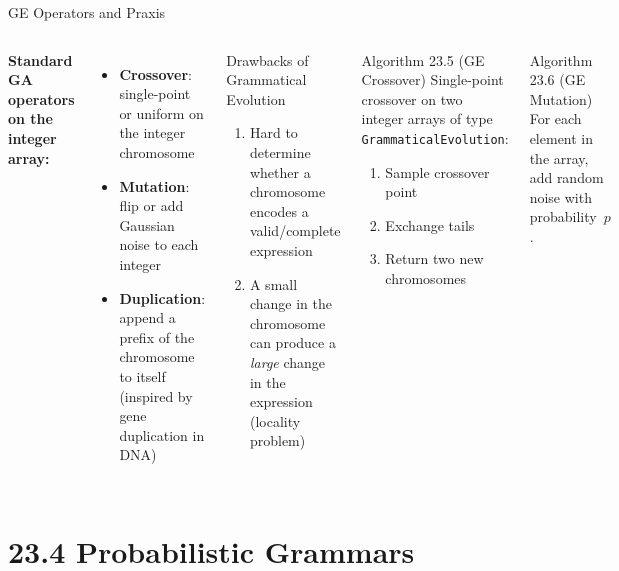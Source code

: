 \documentclass[aspectratio=169,10pt]{beamer}
\begin{document}
\begin{frame}{GE Operators and Praxis}
  \begin{columns}[T]
    \textbf{Standard GA operators on the integer array:}
    \begin{itemize}
      \item \textbf{Crossover}: single-point or uniform on the integer chromosome
      \item \textbf{Mutation}: flip or add Gaussian noise to each integer
      \item \textbf{Duplication}: append a prefix of the chromosome to itself (inspired by gene duplication in DNA)
    \end{itemize}
    \medskip
    \begin{alertblock}{Drawbacks of Grammatical Evolution}
      \begin{enumerate}
        \item Hard to determine whether a chromosome encodes a valid/complete expression
        \item A small change in the chromosome can produce a \emph{large} change in the expression (locality problem)
      \end{enumerate}
    \end{alertblock}
    \begin{block}{Algorithm 23.5 (GE Crossover)}
      Single-point crossover on two integer arrays of type \texttt{GrammaticalEvolution}:
      \begin{enumerate}\small
        \item Sample crossover point
        \item Exchange tails
        \item Return two new chromosomes
      \end{enumerate}
    \end{block}
    \medskip
    \begin{block}{Algorithm 23.6 (GE Mutation)}
      For each element in the array, add random noise with probability~$p$.
    \end{block}
  \end{columns}
\end{frame}

\section{23.4 Probabilistic Grammars}
\end{document}
